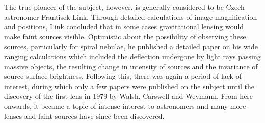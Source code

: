 		The true pioneer of the subject, however, is generally considered to be Czech astronomer\cite{F_Link_GL} Frantisek Link. Through detailed calculations of image magnification and positions, Link concluded that in some cases gravitational lensing would make faint sources visible. Optimistic about the possibility of observing these sources, particularly for spiral nebulae, he published a detailed paper on his wide ranging calculations which included the deflection undergone by light rays passing massive objects, the resulting change in intensity of sources and the invariance of source surface brightness. Following this, there was again a period of lack of interest, during which only a few papers were published on the subject until the discovery of the first lens in 1979 by Walsh, Carswell and Weymann. From here onwards, it became a topic of intense interest to astronomers and many more lenses and faint sources have since been discovered\cite{Conceptual_origins_of_GL}.

